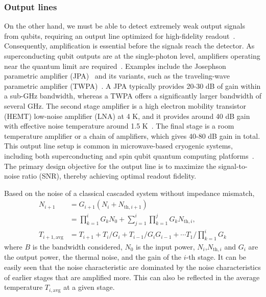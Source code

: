 \documentclass[a4paper,onecolumn,11pt,unpublished]{quantumarticle}
\begin{document}
\subsubsection{Output lines}
On the other hand, we must be able to detect extremely weak output signals from qubits, requiring an output line optimized for high-fidelity readout~\cite{Walter2017Rapid,Eichler2012Characterizing}. Consequently, amplification is essential before the signals reach the detector. As superconducting qubit outputs are at the single-photon level, amplifiers operating near the quantum limit are required~\cite{Blais2021Circuit,Clerk2010Introduction,Caves1982Quantum}. Examples include the Josephson parametric amplifier (JPA)~\cite{Castellanos-Beltran2007Widely,Bergeal2010Phasepreserving,Hatridge2011Dispersive,Yamamoto2008Fluxdriven,Roch2012Widely,Eichler2014Controlling} and its variants, such as the traveling-wave parametric amplifier (TWPA)~\cite{Macklin2015A,Heinsoo2018Rapid}. A JPA typically provides 20-30 dB of gain within a sub-GHz bandwidth, whereas a TWPA offers a significantly larger bandwidth of several GHz. The second stage amplifier is a high electron mobility transistor (HEMT) low-noise amplifier (LNA) at 4 K, and it provides around 40 dB gain with effective noise temperature around 1.5 K~\cite{Zeng2023LowPower,Zeng2023100W}. The final stage is a room temperature amplifier or a chain of amplifiers, which gives 40-80 dB gain in total. This output line setup is common in microwave-based cryogenic systems, including both superconducting and spin qubit quantum computing platforms~\cite{Prabowo2024Modeling}. The primary design objective for the output line is to maximize the signal-to-noise ratio (SNR), thereby achieving optimal readout fidelity.

Based on the noise of a classical cascaded system without impedance mismatch,~\cite{Pozar2012Microwave}
\begin{align}
  N_{i+1}            & = G_{i+1}(N_i +N_{\text{th},i+1})  \label{eq:noise_output_cascade}                                                  \\
                     & = \prod_{k=1}^i G_k N_0 + \sum_{j=1}^i \prod_{k=1}^j G_k N_{\text{th},i}, \label{eq:noise_output_cascade_per_level} \\
  T_{i+1,\text{avg}} & = T_{i+1} + T_{i} / G_{i} + T_{i-1} / G_i G_{i-1} + \cdots T_1 / \prod_{k=1}^i G_k
\end{align}
where $B$ is the bandwidth considered, $N_0$ is the input power, $N_i$,$N_{\text{th},i}$ and $G_i$ are the output power, the thermal noise, and the gain of the $i$-th stage. It can be easily seen that the noise characteristic are dominated by the noise characteristics of earlier stages that are amplified more. This can also be reflected in the average temperature $T_{i, \text{avg}}$ at a given stage.
\end{document}
